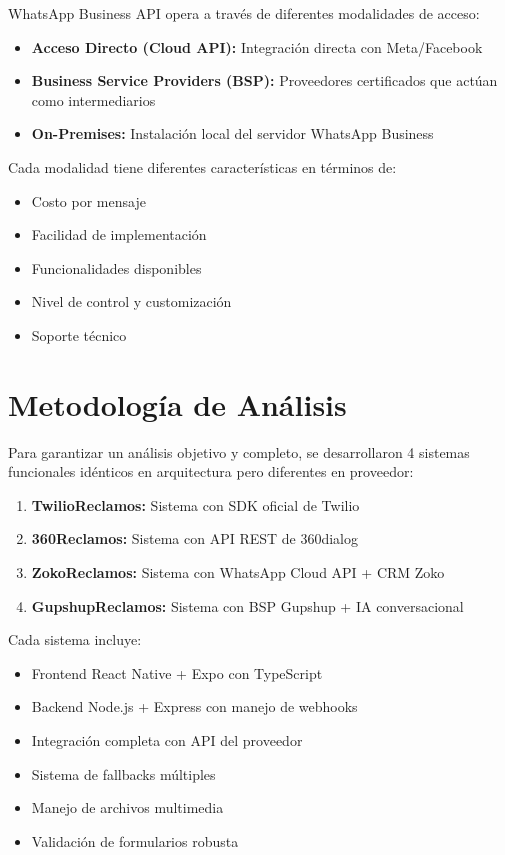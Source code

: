 \documentclass{article}
\begin{document}
\textnormal{WhatsApp Business API opera a través de diferentes modalidades de acceso:}

\begin{itemize}[label=$\bullet$]
    \item \textbf{Acceso Directo (Cloud API):} Integración directa con Meta/Facebook
    \item \textbf{Business Service Providers (BSP):} Proveedores certificados que actúan como intermediarios
    \item \textbf{On-Premises:} Instalación local del servidor WhatsApp Business
\end{itemize}

\textnormal{Cada modalidad tiene diferentes características en términos de:}
\begin{itemize}[label=$\circ$]
    \item Costo por mensaje
    \item Facilidad de implementación
    \item Funcionalidades disponibles
    \item Nivel de control y customización
    \item Soporte técnico
\end{itemize}

\section{Metodología de Análisis}

\textnormal{Para garantizar un análisis objetivo y completo, se desarrollaron 4 sistemas funcionales idénticos en arquitectura pero diferentes en proveedor:}

\begin{enumerate}
    \item \textbf{TwilioReclamos:} Sistema con SDK oficial de Twilio
    \item \textbf{360Reclamos:} Sistema con API REST de 360dialog  
    \item \textbf{ZokoReclamos:} Sistema con WhatsApp Cloud API + CRM Zoko
    \item \textbf{GupshupReclamos:} Sistema con BSP Gupshup + IA conversacional
\end{enumerate}

\textnormal{Cada sistema incluye:}
\begin{itemize}[label=$\checkmark$]
    \item Frontend React Native + Expo con TypeScript
    \item Backend Node.js + Express con manejo de webhooks
    \item Integración completa con API del proveedor
    \item Sistema de fallbacks múltiples
    \item Manejo de archivos multimedia
    \item Validación de formularios robusta
\end{itemize}
\end{document}
